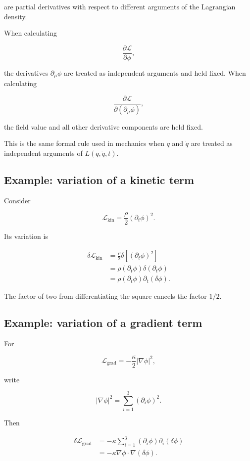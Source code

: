 are partial derivatives with respect to different arguments of the Lagrangian density.

When calculating

\[
\frac{\partial\mathcal{L}}{\partial\phi},
\]

the derivatives \(\partial_{\mu}\phi\) are treated as independent arguments and held fixed. When calculating

\[
\frac{\partial\mathcal{L}}
{\partial(\partial_{\mu}\phi)},
\]

the field value and all other derivative components are held fixed.

This is the same formal rule used in mechanics when \(q\) and \(\dot q\) are treated as independent arguments of \(L(q,\dot q,t)\).

\subsection{Example: variation of a kinetic term}

Consider

\[
\mathcal{L}_{\mathrm{kin}}
=
\frac{\rho}{2}
(\partial_{t}\phi)^{2}.
\]

Its variation is

\[
\begin{aligned}
\delta\mathcal{L}_{\mathrm{kin}}
&=
\frac{\rho}{2}
\delta\left[(\partial_{t}\phi)^{2}\right]\\
&=
\rho
(\partial_{t}\phi)
\delta(\partial_{t}\phi)\\
&=
\rho
(\partial_{t}\phi)
\partial_{t}(\delta\phi).
\end{aligned}
\]

The factor of two from differentiating the square cancels the factor \(1/2\).

\subsection{Example: variation of a gradient term}

For

\[
\mathcal{L}_{\mathrm{grad}}
=
-\frac{\kappa}{2}
|\nabla\phi|^{2},
\]

write

\[
|\nabla\phi|^{2}
=
\sum_{i=1}^{3}
(\partial_{i}\phi)^{2}.
\]

Then

\[
\begin{aligned}
\delta\mathcal{L}_{\mathrm{grad}}
&=
-\kappa
\sum_{i=1}^{3}
(\partial_{i}\phi)
\partial_{i}(\delta\phi)\\
&=
-\kappa
\nabla\phi\cdot\nabla(\delta\phi).
\end{aligned}
\]

